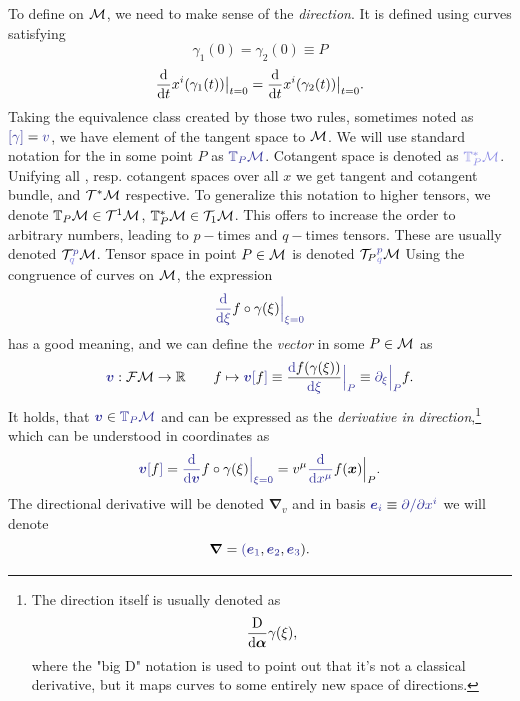 To define  on $\mathcal{M}$, we need to make sense of the \emph{direction}. It is defined using curves satisfying 
$$\gamma_1(0)=\gamma_2(0)\equiv P$$
$$\frac{\mathrm{d} }{\mathrm{d} t}x^i(\gamma_1(t))\big|_{t=0}=\frac{\mathrm{d} }{\mathrm{d} t}x^i(\gamma_2(t))\big|_{t=0}.$$
Taking the equivalence class created by those two rules, sometimes noted as $\bluee{[\gamma]}=\bluee v$, we have element of the tangent space to $\mathcal{M}$. We will use standard notation for the  in some point $P$ as $\bluee{\T_P\M}$. Cotangent space is denoted as $\blueee{\T^*_P\M}$. Unifying all , resp. cotangent spaces over all $x$ we get tangent and cotangent bundle, \bluee{$\TT\M$} and $\mathcal{T}^*\mathcal{M}$ respective. To generalize this notation to higher tensors, we denote $\mathbb{T}_P\mathcal{M}\in \mathcal{T}^1\mathcal{M}$, $\mathbb{T}^*_P\mathcal{M}\in \mathcal{T}_1\mathcal{M}$. This offers to increase the order to arbitrary numbers, leading to $p-$times  and $q-$times  tensors. These are usually denoted $\TT^{\bluee p}_{\blueee q} \M$. Tensor space in point $P\in\mathcal{M}$ is denoted ${\TT_P}^{\bluee p}_{\blueee q} \M$
Using the congruence of curves on $\mathcal{M}$, the expression 
\begin{equation}
    \bluee{\der{}{\xi}}f\circ \gamma(\xi)\bluee{\Big|_{\xi=0}}
\end{equation}
has a good meaning, and we can define the \emph{vector} in some $P\in\mathcal{M}$ as
\begin{equation}
    \bluee{\bm v}: \FM\rightarrow \R \qquad f\mapsto \bluee{\bm v[}f\bluee ]\equiv \frac{\bluee \d f(\gamma(\xi))}{\bluee{\d \xi}}\bluee{\Big|_P} \equiv \bluee{\partial_\xi\Big|_P} f .
\end{equation}
It holds, that $\bluee{\bm v}\in \bluee{\T_P\M}$ and can be expressed as the \emph{derivative in direction},\footnote{
        The direction itself is usually denoted as
        \begin{equation}
            \frac{\mathrm{D}}{\mathrm{d}\bm\alpha}\gamma(\xi),
        \end{equation}
        where the "big D" notation is used to point out that it's not a classical derivative, but it maps curves to some entirely new space of directions.
    } 
which can be understood in coordinates as
\begin{equation}
    \bluee{\bm v[}f\bluee ] = \bluee{\der{}{\bm v}} f\circ \gamma(\xi)\bluee{\Big|_{\xi=0}}=v^\mu\bluee{\der{}{x^\mu}} f(\bm x)\Big|_{P}.
\end{equation}
The directional derivative will be denoted $\bm\nabla_v$
and in basis $\bluee{\bm e_i} \equiv \bluee{\partial/\partial x^i}$ we will denote 
$$\bm\nabla=\bluee(\bluee{\bm e_1}, \bluee{\bm e_2},\bluee{\bm e_3}).$$


